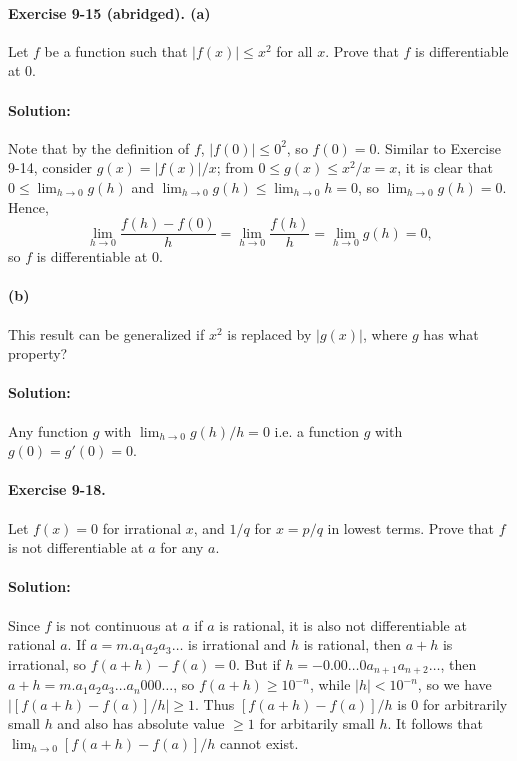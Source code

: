 \documentclass{article}
\begin{document}
\paragraph{Exercise 9-15 (abridged). (a)} Let $f$ be a function such that
$|f(x)| \leq x^2$ for all $x$. Prove that $f$ is differentiable at 0.

\paragraph{Solution:} Note that by the definition of $f$, $|f(0)| \leq 0^2$, so
$f(0) = 0$. Similar to Exercise 9-14, consider $g(x) = |f(x)|/x$; from $0 \leq
g(x) \leq x^2/x = x$, it is clear that $0 \leq \lim_{h \rightarrow 0}{g(h)}$
and $\lim_{h \rightarrow 0}{g(h)} \leq \lim_{h \rightarrow 0}{h} = 0$, so
$\lim_{h \rightarrow 0}{g(h)} = 0$. Hence, \begin{equation*}
  \lim_{h \rightarrow 0}{\frac{f(h) - f(0)}{h}} = \lim_{h \rightarrow 0}{\frac
  {f(h)}{h}} = \lim_{h \rightarrow 0}{g(h)} = 0,
\end{equation*} so $f$ is differentiable at 0.

\paragraph{(b)} This result can be generalized if $x^2$ is replaced by
$|g(x)|$, where $g$ has what property?

\paragraph{Solution:} Any function $g$ with $\lim_{h \rightarrow 0}g(h)/h = 0$
i.e. a function $g$ with $g(0) = g'(0) = 0$.

\paragraph{Exercise 9-18.} Let $f(x) = 0$ for irrational $x$, and $1/q$ for $x
= p/q$ in lowest terms. Prove that $f$ is not differentiable at $a$ for any
$a$.

\paragraph{Solution:} Since $f$ is not continuous at $a$ if $a$ is rational, it
is also not differentiable at rational $a$. If $a = m.a_1a_2a_3\ldots$ is
irrational and $h$ is rational, then $a + h$ is irrational, so $f(a + h) - f(a)
= 0$. But if $h = -0.00\ldots0a_{n+1}a_{n+2}\ldots$, then $a + h = m.a_1a_2a_3
\ldots a_n000\ldots$, so $f(a + h) \geq 10^{-n}$, while $|h| < 10^{-n}$, so we
have $|[f(a + h) - f(a)]/h| \geq 1$. Thus $[f(a + h) - f(a)]/h$ is 0 for
arbitrarily small $h$ and also has absolute value $\geq 1$ for arbitarily small
$h$. It follows that $\lim_{h \rightarrow 0}{[f(a + h) - f(a)]/h}$ cannot
exist.
\end{document}
